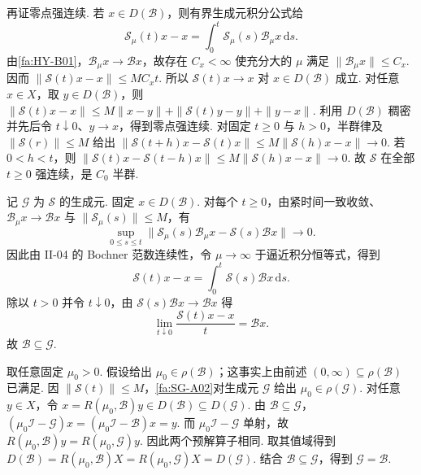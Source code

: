 \begin{FAProof}
再证零点强连续. 若 \(\displaystyle x\in D(\mathcal B)\)，则有界生成元积分公式给
\[
\mathcal S_\mu(t)x-x
=
\int_0^t\mathcal S_\mu(s)\mathcal B_\mu x\,\mathrm{d}s.
\]
由\autoref{fa:HY-B01}，\(\displaystyle\mathcal B_\mu x\to\mathcal Bx\)，故存在 \(\displaystyle C_x<\infty\) 使充分大的 \(\displaystyle\mu\) 满足 \(\displaystyle\|\mathcal B_\mu x\|\leqslant C_x\). 因而 \(\displaystyle \|\mathcal S(t)x-x\| \leqslant MC_xt.\)
所以 \(\displaystyle\mathcal S(t)x\to x\) 对 \(\displaystyle x\in D(\mathcal B)\) 成立. 对任意 \(\displaystyle x\in X\)，取 \(\displaystyle y\in D(\mathcal B)\)，则 \(\displaystyle \|\mathcal S(t)x-x\| \leqslant M\|x-y\|+\|\mathcal S(t)y-y\|+\|y-x\|.\)
利用 \(\displaystyle D(\mathcal B)\) 稠密并先后令 \(\displaystyle t\downarrow0\)、\(\displaystyle y\to x\)，得到零点强连续. 对固定 \(\displaystyle t\geqslant0\) 与 \(\displaystyle h>0\)，半群律及 \(\displaystyle\|\mathcal S(r)\|\leqslant M\) 给出 \(\displaystyle \|\mathcal S(t+h)x-\mathcal S(t)x\| \leqslant M\|\mathcal S(h)x-x\| \longrightarrow0.\)
若 \(\displaystyle 0<h<t\)，则 \(\displaystyle \|\mathcal S(t)x-\mathcal S(t-h)x\| \leqslant M\|\mathcal S(h)x-x\| \longrightarrow0.\)
故 \(\displaystyle\mathcal S\) 在全部 \(\displaystyle t\geqslant0\) 强连续，是 \(\displaystyle C_0\) 半群.

记 \(\displaystyle\mathcal G\) 为 \(\displaystyle\mathcal S\) 的生成元. 固定 \(\displaystyle x\in D(\mathcal B)\). 对每个 \(\displaystyle t\geqslant0\)，由紧时间一致收敛、\(\displaystyle\mathcal B_\mu x\to\mathcal Bx\) 与 \(\displaystyle\|\mathcal S_\mu(s)\|\leqslant M\)，有
\[
\sup_{0\leqslant s\leqslant t}
\|\mathcal S_\mu(s)\mathcal B_\mu x-\mathcal S(s)\mathcal Bx\|
\longrightarrow0.
\]
因此由 II-04 的 Bochner 范数连续性，令 \(\displaystyle\mu\to\infty\) 于逼近积分恒等式，得到
\[
\mathcal S(t)x-x
=
\int_0^t\mathcal S(s)\mathcal Bx\,\mathrm{d}s.
\]
除以 \(\displaystyle t>0\) 并令 \(\displaystyle t\downarrow0\)，由 \(\displaystyle\mathcal S(s)\mathcal Bx\to\mathcal Bx\) 得
\[
\lim_{t\downarrow0}\frac{\mathcal S(t)x-x}{t}
=
\mathcal Bx.
\]
故 \(\displaystyle\mathcal B\subseteq\mathcal G\).

取任意固定 \(\displaystyle\mu_0>0\). 假设给出 \(\displaystyle\mu_0\in\rho(\mathcal B)\)；这事实上由前述 \(\displaystyle(0,\infty)\subseteq\rho(\mathcal B)\) 已满足. 因 \(\displaystyle\|\mathcal S(t)\|\leqslant M\)，\autoref{fa:SG-A02}对生成元 \(\displaystyle\mathcal G\) 给出 \(\displaystyle\mu_0\in\rho(\mathcal G)\). 对任意 \(\displaystyle y\in X\)，令 \(\displaystyle x=R(\mu_0,\mathcal B)y\in D(\mathcal B)\subseteq D(\mathcal G).\)
由 \(\displaystyle\mathcal B\subseteq\mathcal G\)， \(\displaystyle (\mu_0\mathcal I-\mathcal G)x = (\mu_0\mathcal I-\mathcal B)x = y.\)
而 \(\displaystyle\mu_0\mathcal I-\mathcal G\) 单射，故 \(\displaystyle R(\mu_0,\mathcal B)y = R(\mu_0,\mathcal G)y.\)
因此两个预解算子相同. 取其值域得到 \(\displaystyle D(\mathcal B) = R(\mu_0,\mathcal B)X = R(\mu_0,\mathcal G)X = D(\mathcal G).\)
结合 \(\displaystyle\mathcal B\subseteq\mathcal G\)，得到 \(\displaystyle\mathcal G=\mathcal B\).


\end{FAProof}
